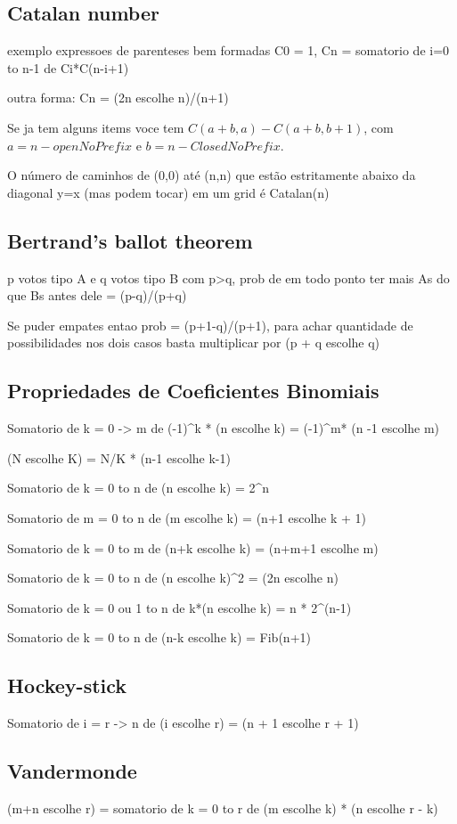 \documentclass{article}
\begin{document}
\subsection{Catalan number} exemplo expressoes de parenteses bem formadas
C0 = 1, Cn = somatorio de i=0 to n-1 de Ci*C(n-i+1)

outra forma: Cn = (2n escolhe n)/(n+1)

Se ja tem alguns items voce tem $C(a + b,a) - C(a + b,b+1)$, com $a = n - openNoPrefix$ e $b = n - ClosedNoPrefix$.

O número de caminhos de (0,0) até (n,n) que estão estritamente abaixo da diagonal y=x (mas podem tocar) em um grid é Catalan(n)

\subsection{Bertrand's ballot theorem} p votos tipo A e q votos tipo B com p>q, prob de em todo ponto ter mais As do que Bs antes dele = (p-q)/(p+q)

Se puder empates entao prob = (p+1-q)/(p+1), para achar quantidade de possibilidades nos dois casos basta multiplicar por (p + q escolhe q)


\subsection{Propriedades de Coeficientes Binomiais}
Somatorio de k = 0 -> m de (-1)^k * (n escolhe k) = (-1)^m* (n -1 escolhe m)

(N escolhe K) = N/K * (n-1 escolhe k-1)

Somatorio de k = 0 to n de (n escolhe k) = 2^n

Somatorio de m = 0 to n de (m escolhe k) = (n+1 escolhe k + 1)

Somatorio de k = 0 to m de (n+k escolhe k) = (n+m+1 escolhe m)

Somatorio de k = 0 to n de (n escolhe k)^2 = (2n escolhe n)

Somatorio de k = 0 ou 1 to n de k*(n escolhe k) = n * 2^(n-1)

Somatorio de k = 0 to n de (n-k escolhe k) = Fib(n+1)

\subsection{Hockey-stick}
Somatorio de i = r -> n de (i escolhe r) = (n + 1 escolhe r + 1)

\subsection{Vandermonde}
(m+n escolhe r) = somatorio de k = 0 to r de (m escolhe k) * (n escolhe r - k)
\end{document}
